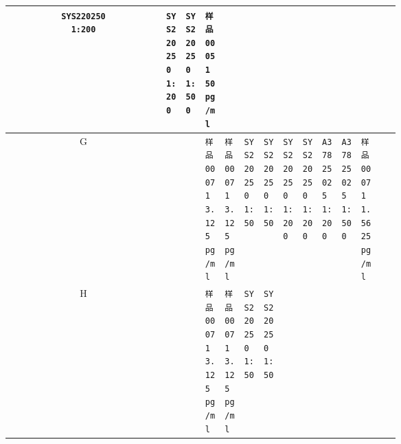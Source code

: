 \documentclass[UTF8,10pt,a4paper,fontset=fandol]{ctexart}
\newcommand{\fieldvalue}[1]{#1}
\begin{document}
\begin{center}
\begin{tabular}{c|*{12}{p{0.055\linewidth}|}}
\fieldvalue{\texttt{SYS220250\\1:200}} &
\fieldvalue{\texttt{SYS220250\\1:200}} &
\fieldvalue{\texttt{SYS220250\\1:500}} &
\fieldvalue{\texttt{样品0005\\1\\50 pg/ml}} &
\\ \hline
G &
&
&
\fieldvalue{\texttt{样品0007\\1\\3.125 pg/ml}} &
\fieldvalue{\texttt{样品0007\\1\\3.125 pg/ml}} &
\fieldvalue{\texttt{SYS220250\\1:50}} &
\fieldvalue{\texttt{SYS220250\\1:50}} &
\fieldvalue{\texttt{SYS220250\\1:200}} &
\fieldvalue{\texttt{SYS220250\\1:200}} &
\fieldvalue{\texttt{A37825025\\1:200}} &
\fieldvalue{\texttt{A37825025\\1:500}} &
\fieldvalue{\texttt{样品0007\\1\\1.5625 pg/ml}} &
\\ \hline
H &
&
&
\fieldvalue{\texttt{样品0007\\1\\3.125 pg/ml}} &
\fieldvalue{\texttt{样品0007\\1\\3.125 pg/ml}} &
\fieldvalue{\texttt{SYS220250\\1:50}} &
\fieldvalue{\texttt{SYS220250\\1:50}} &

\end{tabular}
\end{center}
\end{document}
